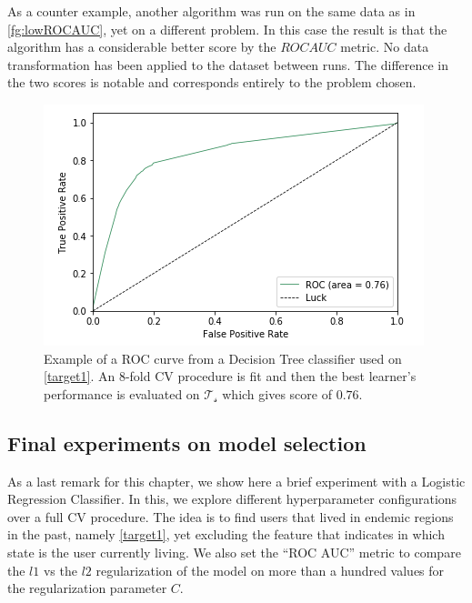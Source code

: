 As a counter example, another algorithm was run on the same data as in \cref{fg:lowROCAUC}, yet on a different problem.
In this case the result is that the algorithm has a considerable better score by the $ROC AUC$ metric.
No data transformation has been applied to the dataset between runs.
The difference in the two scores is notable and corresponds entirely to the problem chosen.

\begin{figure}[h!]
\begin{center}
\includegraphics[width=1\columnwidth]{figures/figure-highROCAUC/figure-highROCAUC}
\caption{Example of a ROC curve from a Decision Tree classifier used on \cref{target1}. An 8-fold CV procedure is fit and then the best learner's performance is evaluated on $\mathcal{T_s}$ which gives score of $0.76$.}
\label{fg:highROCAUC}
\end{center}
\end{figure}


\subsection{Final experiments on model selection}\label{sub:final_model_selection}

As a last remark for this chapter, we show here a brief experiment with a Logistic Regression Classifier.
In this, we explore different hyperparameter configurations over a full CV procedure.
The idea is to find users that lived in endemic regions in the past, namely \cref{target1}, yet excluding the feature that indicates in which state is the user currently living.
We also set the ``ROC AUC'' metric to compare the $l1$ vs the $l2$ regularization of the model on more than a hundred values for the regularization parameter $C$.


